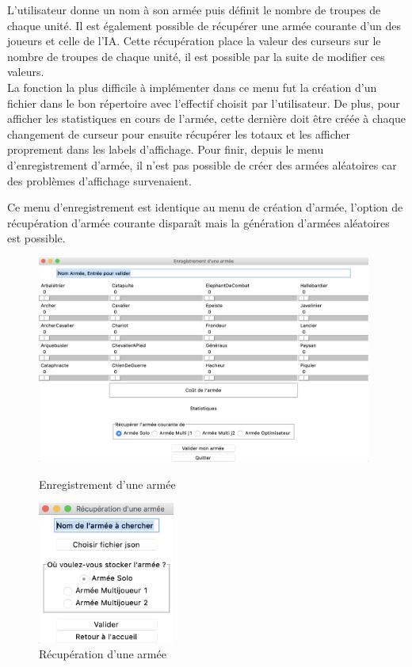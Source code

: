 \documentclass[a4paper]{article} %
\begin{document}
L'utilisateur donne un nom à son armée puis définit le nombre de troupes de chaque unité. Il est également possible de récupérer une armée courante d'un des joueurs et celle de l'IA. Cette récupération place la valeur des curseurs sur le nombre de troupes de chaque unité, il est possible par la suite de modifier ces valeurs.\\

La fonction la plus difficile à implémenter dans ce menu fut la création d'un fichier dans le bon répertoire avec l'effectif choisit par l'utilisateur. De plus, pour afficher les statistiques en cours de l'armée, cette dernière doit être créée à chaque changement de curseur pour ensuite récupérer les totaux et les afficher proprement dans les labels d'affichage. Pour finir, depuis le menu d'enregistrement d'armée, il n'est pas possible de créer des armées aléatoires car des problèmes d'affichage survenaient.

Ce menu d'enregistrement est identique au menu de création d'armée, l'option de récupération d'armée courante disparaît mais la génération d'armées aléatoires est possible.\\

\begin{figure}[!h]
	\begin{center}
	\includegraphics[width=11cm]{Images/enregistrerArmee.png}
	\caption{Enregistrement d'une armée\label{fig:EnregistrerArmee}}
	\end{center}
	\begin{center}
	\includegraphics[width=4.5cm]{Images/recupArmee.png}
	\caption{Récupération d'une armée\label{fig:RecuperationArmee}}
	\end{center}
\end{figure}
\end{document}
